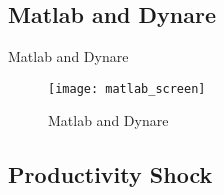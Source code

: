 \documentclass[../quali_slides.tex]{subfiles}
\begin{document}

\subsection{Matlab and Dynare}

\begin{frame}{Matlab and Dynare}
	
	\begin{figure}[h!]
		\centering
		\texttt{[image: matlab\_screen]}
		\caption{Matlab and Dynare}
		\label{fig:matlab}
	\end{figure}
	
\end{frame}


\subsection{Productivity Shock}
\end{document}
